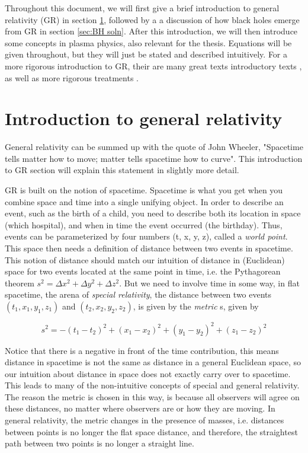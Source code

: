 Throughout this document, we will first give a brief introduction to general relativity (GR) in section \ref{sec:Intro to GR}, followed by a a discussion of how black holes emerge from GR in section \ref{sec:BH soln}. After this introduction, we will then introduce some concepts in plasma physics, also relevant for the thesis. Equations will be given throughout, but they will just be stated and described intuitively. For a more rigorous introduction to GR, their are many great texts introductory texts \cite{carroll2019spacetime, hartle2003gravity}, as well as more rigorous treatments \cite{wald2010general}.

\section{Introduction to general relativity}\label{sec:Intro to GR}

General relativity can be summed up with the quote of John Wheeler, "Spacetime tells matter how to move; matter tells spacetime how to curve". This introduction to GR section will explain this statement in slightly more detail.

GR is built on the notion of spacetime. Spacetime is what you get when you combine space and time into a single unifying object. In order to describe an event, such as the birth of a child, you need to describe both its location in space (which hospital), and when in time the event occurred (the birthday). Thus, events can be parameterized by four numbers (t, x, y, z), called a \textit{world point}. This space then needs a definition of distance between two events in spacetime. This notion of distance should match our intuition of distance in (Euclidean) space for two events located at the same point in time, i.e. the Pythagorean theorem 
$s^2 = \Delta x^2 + \Delta y^2 + \Delta z^2$. But we need to involve time in some way, in flat spacetime, the arena of \textit{special relativity}, the distance between two events $(t_1,x_1,y_1,z_1)$ and $(t_2,x_2,y_2,z_2)$, is given by the \textit{metric} s, given by 

\begin{equation}\label{eq:Flat spacetime metric}
    s^2 = - (t_1-t_2)^2 + (x_1-x_2)^2 + (y_1-y_2)^2 + (z_1-z_2)^2
\end{equation}

Notice that there is a negative in front of the time contribution, this means distance in spacetime is not the same as distance in a general Euclidean space, so our intuition about distance in space does not exactly carry over to spacetime. This leads to many of the non-intuitive concepts of special and general relativity. The reason the metric is chosen in this way, is because all observers will agree on these distances, no matter where observers are or how they are moving. In general relativity, the metric changes in the presence of masses, i.e. distances between points is no longer the flat space distance, and therefore, the straightest path between two points is no longer a straight line.



